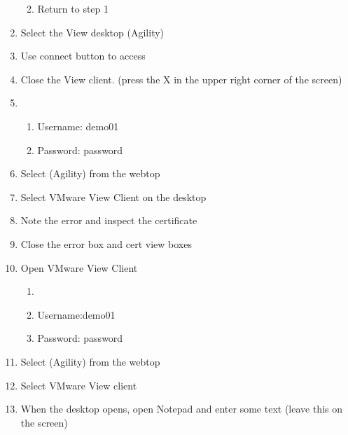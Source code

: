 \documentclass[letterpaper,10pt,english]{sphinxmanual}
\begin{document}
\begin{enumerate}
\begin{enumerate}
\begin{enumerate}
\end{enumerate}

\item {} 
Return to step 1

\end{enumerate}

\item {} 
Select the View desktop (Agility)

\item {} 
Use connect button to access

\item {} 
Close the View client. (press the X in the upper right corner of the
screen)

\item {} 
\begin{enumerate}
\item {} 
Username: demo01

\item {} 
Password: password

\end{enumerate}

\item {} 
Select (Agility) from the webtop

\item {} 
Select VMware View Client on the desktop

\item {} 
Note the error and inspect the certificate

\item {} 
Close the error box and cert view boxes

\item {} 
Open VMware View Client
\begin{enumerate}
\item {} 

\item {} 
Username:demo01

\item {} 
Password: password

\end{enumerate}

\item {} 
Select (Agility) from the webtop

\item {} 
Select VMware View client

\item {} 
When the desktop opens, open Notepad and enter some text (leave this
on the screen)


\end{enumerate}
\end{document}
